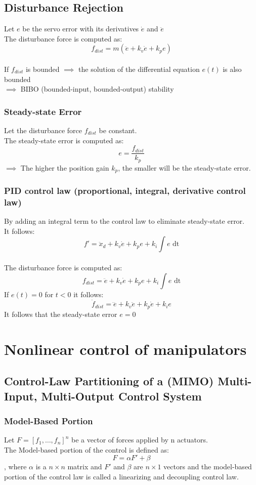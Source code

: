 \documentclass[10pt,a4paper]{article}
\begin{document}
\subsection{Disturbance Rejection}
Let $e$ be the servo error with its derivatives $\dot e$ and $\ddot e$ \\
The disturbance force is computed as:
$$
f_{dist} = m(\ddot e + k_v \dot e + k_p e)
$$
\\

If $f_{dist}$ is bounded $\implies$ the solution of the differential equation $e(t)$ is also bounded \\
$\implies$ BIBO (bounded-input, bounded-output) stability

\subsubsection{Steady-state Error}
Let the disturbance force $f_{dist}$ be constant. \\
The steady-state error is computed as:
$$
e = \frac{f_{dist}}{k_p}
$$
$\implies$ The higher the position gain $k_p$, the smaller will be the steady-state error.

\subsubsection{PID control law (proportional, integral, derivative control law)}
By adding an integral term to the control law to eliminate steady-state error. \\
It follows: \\
$$
f' = \ddot x_d + k_v \dot e + k_p e + k_i \int e \textrm{ dt}
$$
\\

The disturbance force is computed as:
$$
f_{dist} = \ddot e + k_v \dot e + k_p e + k_i \int e \textrm{ dt}
$$
If $e(t) = 0$ for $t < 0$ it follows:
$$
\dot f_{dist} = \dddot{e} + k_v \ddot e + k_p \dot e + k_i e
$$
It follows that the steady-state error $e = 0$

\section{Nonlinear control of manipulators}
\subsection{Control-Law Partitioning of a (MIMO) Multi-Input, Multi-Output Control System}
\subsubsection{Model-Based Portion}
Let $F = [f_1, \dots, f_n]^n$ be a vector of forces applied by n actuators. \\
The Model-based portion of the control is defined as: 
$$
F = \alpha F' + \beta
$$
, where $\alpha$ is a $n \times n$ matrix and $F'$ and $\beta$ are $n \times 1$ vectors
and the model-based portion of the control law is called a linearizing and decoupling control law.
\end{document}
